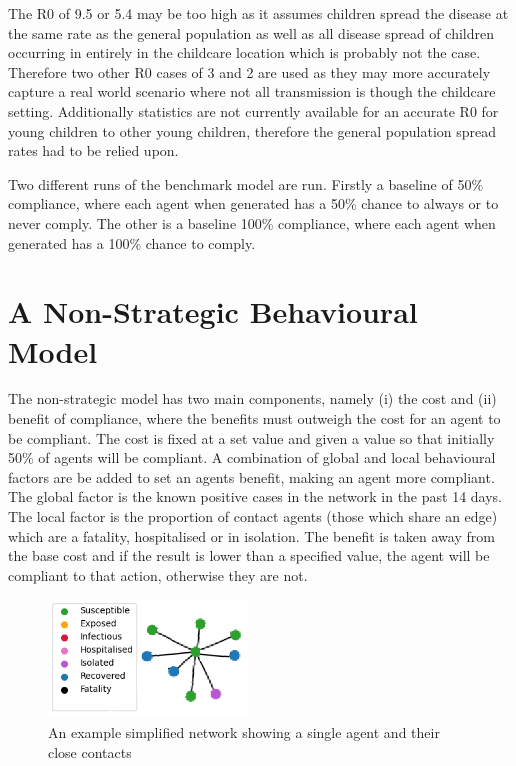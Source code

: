 \documentclass{article}
\begin{document}
The R0 of 9.5 or 5.4 may be too high as it assumes children spread the disease at the same rate as the general population as well as all disease spread of children occurring in entirely in the childcare location which is probably not the case. Therefore two other R0 cases of 3 and 2 are used as they may more accurately capture a real world scenario where not all transmission is though the childcare setting. Additionally statistics are not currently available for an accurate R0 for young children to other young children, therefore the general population spread rates had to be relied upon. \newline

Two different runs of the benchmark model are run. Firstly a baseline of 50\% compliance, where each agent when generated has a 50\% chance to always or to never comply. The other is a baseline 100\% compliance, where each agent when generated has a 100\% chance to comply. 


\section{A Non-Strategic Behavioural Model}
The non-strategic model has two main components, namely (i) the cost and (ii) benefit of compliance, where the benefits must outweigh the cost for an agent to be compliant.
The cost is fixed at a set value and given a value so that initially 50\% of agents will be compliant. 
A combination of global and local behavioural factors are be added to set an agents benefit, making an agent more compliant.
The global factor is the known positive cases in the network in the past 14 days. 
The local factor is the proportion of contact agents (those which share an edge) which are a fatality, hospitalised or in isolation. 
The benefit is taken away from the base cost and if the result is lower than a specified value, the agent will be compliant to that action, otherwise they are not.\newline

\begin{figure}[h!]
\centering
\includegraphics[width =150pt]{basicnet}
\caption{An example simplified network showing a single agent and their close contacts}
\end{figure}
\end{document}
